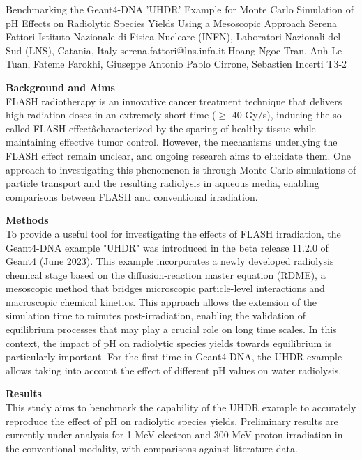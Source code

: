 \begin{talk}
  {Benchmarking the Geant4-DNA 'UHDR' Example for Monte Carlo Simulation of pH Effects on Radiolytic Species Yields Using a Mesoscopic Approach}%
  {Serena Fattori}%
  {Istituto Nazionale di Fisica Nucleare (INFN), Laboratori Nazionali del Sud (LNS), Catania, Italy}%
  {serena.fattori@lns.infn.it}%
  {Hoang Ngoc Tran, Anh Le Tuan, Fateme Farokhi, Giuseppe Antonio Pablo Cirrone, Sebastien Incerti}%
  {T3-2}%
			
\textbf{Background and Aims}\\
FLASH radiotherapy is an innovative cancer treatment technique that delivers high radiation doses in an extremely short time ($\geq$ 40 Gy/s), inducing the so-called FLASH effectâcharacterized by the sparing of healthy tissue while maintaining effective tumor control. However, the mechanisms underlying the FLASH effect remain unclear, and ongoing research aims to elucidate them. One approach to investigating this phenomenon is through Monte Carlo simulations of particle transport and the resulting radiolysis in aqueous media, enabling comparisons between FLASH and conventional irradiation.

\textbf{Methods}\\
To provide a useful tool for investigating the effects of FLASH irradiation, the Geant4-DNA example "UHDR" was introduced in the beta release 11.2.0 of Geant4 (June 2023). This example incorporates a newly developed radiolysis chemical stage based on the diffusion-reaction master equation (RDME), a mesoscopic method that bridges microscopic particle-level interactions and macroscopic chemical kinetics. This approach allows the extension of the simulation time to minutes post-irradiation, enabling the validation of equilibrium processes that may play a crucial role on long time scales. In this context, the impact of pH on radiolytic species yields towards equilibrium is particularly important. For the first time in Geant4-DNA, the UHDR example allows taking into account the effect of different pH values on water radiolysis.

\textbf{Results}\\
This study aims to benchmark the capability of the UHDR example to accurately reproduce the effect of pH on radiolytic species yields. Preliminary results are currently under analysis for 1 MeV electron and 300 MeV proton irradiation in the conventional modality, with comparisons against literature data.


\end{talk}

